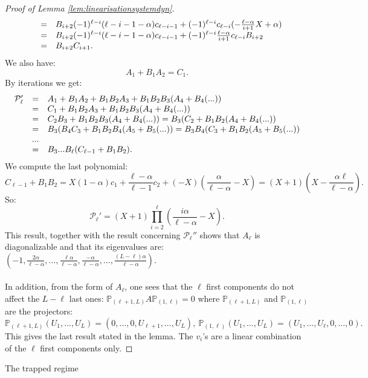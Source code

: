 \documentclass[11pt,a4paper,reqno]{amsart}
\theoremstyle{remark}
\numberwithin{equation}{section}
\begin{document}
\begin{proof}[Proof of Lemma \ref{lem:linearisationsystemdyn}]
$$\begin{array}{r c l}
&=& B_{i+2}(-1)^{\ell-i}(\ell-i-1-\alpha)c_{\ell-i-1}  + (-1)^{\ell-i}c_{\ell-i}(-\frac{\ell-\alpha}{i+1}X+\alpha)\\
&=& B_{i+2}(-1)^{\ell-i}(\ell-i-1-\alpha)c_{\ell-i-1}  + (-1)^{\ell-i}\frac{\ell-\alpha}{i+1}c_{\ell-i}B_{i+2} \\
&=& B_{i+2}C_{i+1} .
\end{array}
$$
We also have:
$$
A_1+B_1A_2=C_1 .
$$
By iterations we get:
$$
\begin{array}{r c l}
\mathcal{P}_{\ell}'&=&A_1+B_1A_2+B_1B_2A_3+B_1B_2B_3(A_4+B_4(...))\\
&=& C_1+B_1B_2A_3+B_1B_2B_3(A_4+B_4(...)) \\
&=& C_2B_3+B_1B_2B_3(A_4+B_4(...)) = B_3(C_2+B_1B_2(A_4+B_4(...)) \\
&=& B_3(B_4C_3+B_1B_2B_4(A_5+B_5(...))= B_3B_4(C_3+B_1B_2(A_5+B_5(...)) \\
&...& \\
&=& B_3...B_{\ell}(C_{\ell-1}+B_1B_2) .\\
\end{array}
$$
We compute the last polynomial:
$$
C_{\ell-1}+B_1B_2=X(1-\alpha)c_1+\frac{\ell-\alpha}{\ell-1}c_2+(-X)\left(\frac{\alpha}{\ell-\alpha}-X\right)=(X+1)\left(X-\frac{\alpha \ell}{\ell-\alpha}\right) .
$$
So:
$$
\mathcal{P}_{\ell}'=(X+1)\prod_{i=2}^{\ell}\left(\frac{i\alpha}{\ell-\alpha}-X\right) .
$$
This result, together with the result concerning $\mathcal{P}_{\ell}''$ shows that $A_{\ell}$ is diagonalizable and that its eigenvalues are: $(-1,\frac{2\alpha}{\ell-\alpha},...,\frac{\ell\alpha}{\ell-\alpha},\frac{-\alpha}{\ell-\alpha},...,\frac{(L-\ell)\alpha}{\ell-\alpha})$.\\
\\
In addition, from the form of $A_{\ell}$, one sees that the $\ell$ first components do not affect the $L-\ell$ last ones: $\mathbb{P}_{(\ell+1,L)}A\mathbb{P}_{(1,\ell)}=0$ where $\mathbb{P}_{(\ell+1,L)}$ and $\mathbb{P}_{(1,\ell)}$ are the projectors:
$$
\mathbb{P}_{(\ell+1,L)}(U_1,...,U_L)=(0,...,0,U_{\ell+1},...,U_L), \ \mathbb{P}_{(1,\ell)}(U_1,...,U_L)=(U_1,...,U_{\ell},0,...,0).
$$ 
This gives the last result stated in the lemma. The $v_i$'s are a linear combination of the $\ell$ first components only.
\end{proof}

{  \z@{1.5\linespacing\@plus\linespacing}{.5\linespacing}  {\normalfont\bfseries\large\centering}}{The trapped regime}
\end{document}
